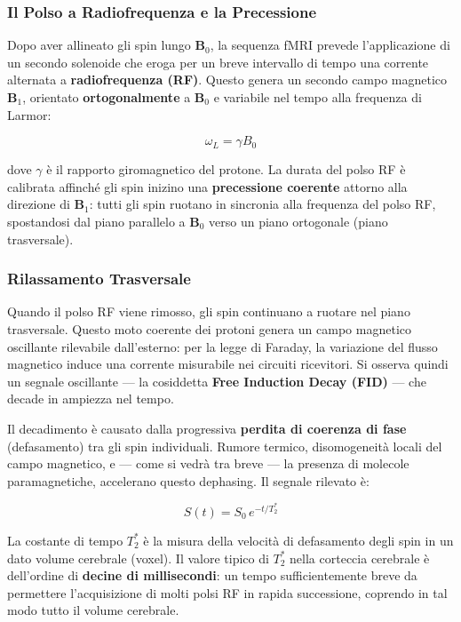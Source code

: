 \subsubsection{Il Polso a Radiofrequenza e la Precessione}

Dopo aver allineato gli spin lungo $\mathbf{B}_0$, la sequenza fMRI prevede l'applicazione di un secondo solenoide che eroga per un breve intervallo di tempo una corrente alternata a \textbf{radiofrequenza (RF)}. Questo genera un secondo campo magnetico $\mathbf{B}_1$, orientato \textbf{ortogonalmente} a $\mathbf{B}_0$ e variabile nel tempo alla frequenza di Larmor:

$$ \omega_L = \gamma B_0 $$

dove $\gamma$ è il rapporto giromagnetico del protone. La durata del polso RF è calibrata affinché gli spin inizino una \textbf{precessione coerente} attorno alla direzione di $\mathbf{B}_1$: tutti gli spin ruotano in sincronia alla frequenza del polso RF, spostandosi dal piano parallelo a $\mathbf{B}_0$ verso un piano ortogonale (piano trasversale).

\subsubsection{Rilassamento Trasversale}

Quando il polso RF viene rimosso, gli spin continuano a ruotare nel piano trasversale. Questo moto coerente dei protoni genera un campo magnetico oscillante rilevabile dall'esterno: per la legge di Faraday, la variazione del flusso magnetico induce una corrente misurabile nei circuiti ricevitori. Si osserva quindi un segnale oscillante — la cosiddetta \textbf{Free Induction Decay (FID)} — che decade in ampiezza nel tempo.

Il decadimento è causato dalla progressiva \textbf{perdita di coerenza di fase} (defasamento) tra gli spin individuali. Rumore termico, disomogeneità locali del campo magnetico, e — come si vedrà tra breve — la presenza di molecole paramagnetiche, accelerano questo dephasing. Il segnale rilevato è:

$$ S(t) = S_0 \, e^{-t / T_2^*} $$

La costante di tempo \textbf{$T_2^*$} è la misura della velocità di defasamento degli spin in un dato volume cerebrale (voxel). Il valore tipico di $T_2^*$ nella corteccia cerebrale è dell'ordine di \textbf{decine di millisecondi}: un tempo sufficientemente breve da permettere l'acquisizione di molti polsi RF in rapida successione, coprendo in tal modo tutto il volume cerebrale.

